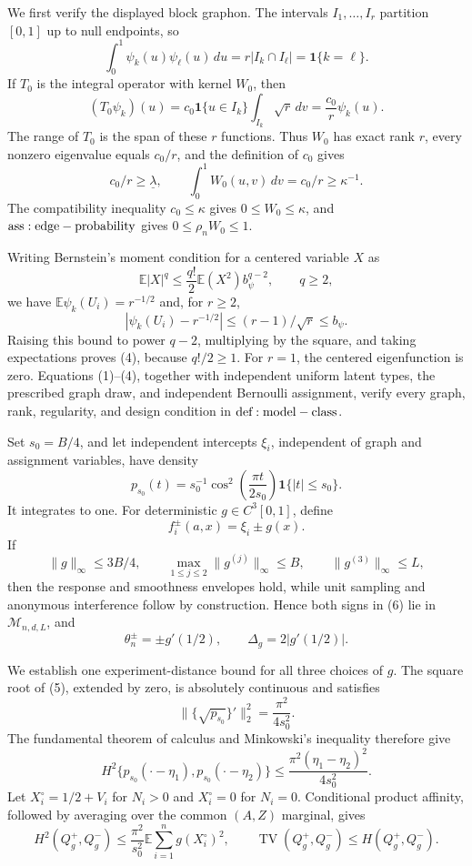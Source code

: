 We first verify the displayed block graphon.  The intervals \(I_1,\ldots,I_r\) partition \([0,1]\) up to null endpoints, so
\[
 \int_0^1\psi_k(u)\psi_\ell(u)\,du
 =r|I_k\cap I_\ell|=\mathbf1\{k=\ell\}.
\tag{1}
\]
If \(T_0\) is the integral operator with kernel \(W_0\), then
\[
 (T_0\psi_k)(u)
 =c_0\mathbf1\{u\in I_k\}\int_{I_k}\sqrt r\,dv
 =\frac{c_0}{r}\psi_k(u).
\tag{2}
\]
The range of \(T_0\) is the span of these \(r\) functions.  Thus \(W_0\) has exact rank \(r\), every nonzero eigenvalue equals \(c_0/r\), and the definition of \(c_0\) gives
\[
 c_0/r\geq\underline\lambda,
 \qquad \int_0^1W_0(u,v)\,dv=c_0/r\geq\kappa^{-1}.
\tag{3}
\]
The compatibility inequality \(c_0\leq\kappa\) gives \(0\leq W_0\leq\kappa\), and \({\rm ass:edge-probability}\) gives \(0\leq\rho_nW_0\leq1\).

Writing Bernstein's moment condition for a centered variable \(X\) as
\[
 \mathbb E|X|^q\leq\frac{q!}{2}\mathbb E(X^2)b_\psi^{q-2},
 \qquad q\geq2,
\tag{4}
\]
we have \(\mathbb E\psi_k(U_i)=r^{-1/2}\) and, for \(r\geq2\),
\[
 |\psi_k(U_i)-r^{-1/2}|\leq(r-1)/\sqrt r\leq b_\psi.
\]
Raising this bound to power \(q-2\), multiplying by the square, and taking expectations proves (4), because \(q!/2\geq1\).  For \(r=1\), the centered eigenfunction is zero.  Equations (1)--(4), together with independent uniform latent types, the prescribed graph draw, and independent Bernoulli assignment, verify every graph, rank, regularity, and design condition in \({\rm def:model-class}\).

Set \(s_0=B/4\), and let independent intercepts \(\xi_i\), independent of graph and assignment variables, have density
\[
 p_{s_0}(t)=s_0^{-1}\cos^2\!\left(\frac{\pi t}{2s_0}\right)
 \mathbf1\{|t|\leq s_0\}.
\tag{5}
\]
It integrates to one.  For deterministic \(g\in C^3[0,1]\), define
\[
 f_i^\pm(a,x)=\xi_i\pm g(x).
\tag{6}
\]
If
\[
 \|g\|_\infty\leq3B/4,
 \qquad \max_{1\leq j\leq2}\|g^{(j)}\|_\infty\leq B,
 \qquad \|g^{(3)}\|_\infty\leq L,
\tag{7}
\]
then the response and smoothness envelopes hold, while unit sampling and anonymous interference follow by construction.  Hence both signs in (6) lie in \(\mathcal M_{n,d,L}\), and
\[
 \theta_n^\pm=\pm g'(1/2),
 \qquad \Delta_g=2|g'(1/2)|.
\tag{8}
\]

We establish one experiment-distance bound for all three choices of \(g\).  The square root of (5), extended by zero, is absolutely continuous and satisfies
\[
 \|\{\sqrt{p_{s_0}}\}'\|_2^2=\frac{\pi^2}{4s_0^2}.
\]
The fundamental theorem of calculus and Minkowski's inequality therefore give
\[
 H^2\{p_{s_0}(\mathord\cdot-\eta_1),p_{s_0}(\mathord\cdot-\eta_2)\}
 \leq\frac{\pi^2(\eta_1-\eta_2)^2}{4s_0^2}.
\tag{9}
\]
Let \(X_i^\circ=1/2+V_i\) for \(N_i>0\) and \(X_i^\circ=0\) for \(N_i=0\).  Conditional product affinity, followed by averaging over the common \((A,Z)\) marginal, gives
\[
 H^2(Q_g^+,Q_g^-)
 \leq\frac{\pi^2}{s_0^2}\mathbb E\sum_{i=1}^ng(X_i^\circ)^2,
 \qquad \operatorname{TV}(Q_g^+,Q_g^-)\leq H(Q_g^+,Q_g^-).
\tag{10}
\]

